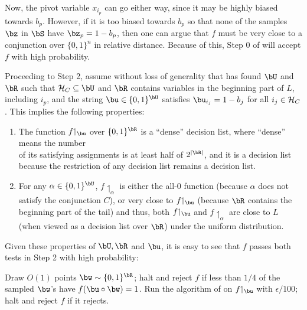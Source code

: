 \documentclass[11pt]{article}
\theoremstyle{definition}
\begin{document}
Now, the pivot variable $x_{i_p}$ can go either way, since 
  it may be highly biased towards $b_{p}$.
However, if it is too biased towards $b_{p}$ so that
  none of the samples $\bz$ in $\bS$ have $\bz_p=1-b_p$, then one can argue that $f$ must be very close
  to a conjunction over $\{0,1\}^n$ in relative distance.
Because of this, Step $0$ of 
  will accept $f$ with high probability.


Proceeding to Step 2, assume without loss of generality that
   has found $\bU$ and $\bR$ such that ${\cal H}_C\subseteq \bU$ and $\bR$ contains variables in the beginning part of $L$, including $i_p$, and the string $\bu\in \{0,1\}^{\bU}$ satisfies $\bu_{i_j}=1-b_j$ for all $i_j\in {\cal H}_C$.
This implies the following properties:
\begin{flushleft}\begin{enumerate}
\item The function $f{\upharpoonleft_{\bu}}$ over $\{0,1\}^{\bR}$  is a ``dense'' decision list, where 
  ``dense'' means the number\\ of its satisfying assignments 
  is at least half of $2^{|\bR|}$, and it is a decision list
  because the restriction of any decision list remains a decision list.
\item For any $\alpha\in \{0,1\}^{\bU}$, $f{\upharpoonleft_{\alpha}}$ is either the all-$0$ function
  (because $\alpha$ does not satisfy the conjunction $C$), or very close to $f{\upharpoonleft_{\bu}}$  (because $\bR$ contains the beginning part of the tail) and thus, both $f{\upharpoonleft_{\bu}}$
  and $f{\upharpoonleft_{\alpha}}$ are close to $L$ (when viewed as a decision list over $\bR$) under the uniform distribution.
\end{enumerate}\end{flushleft}




Given these properties of $\bU,\bR$ and $\bu$, it is easy to see that $f$ passes both tests in Step 2 with high probability:
\medskip

\begin{algorithm}[H]\begin{algorithmic}[1]\vspace{0.2cm}
    \setcounter{ALG@line}{2}
        \State Draw  $O(1)$ points $\bw\sim \{0,1\}^{\bR}$;
    halt and reject 
    $f$
if less than $1/4$ of the sampled $\bw$'s have  $f(\bu\circ \bw)=1$. \State Run the algorithm of  on $f{\upharpoonleft_{\bu}}$ with $\epsilon/100$;
     halt and reject $f$ if it rejects.\vspace{0.15cm}
    \end{algorithmic}
\end{algorithm}\medskip
\end{document}
